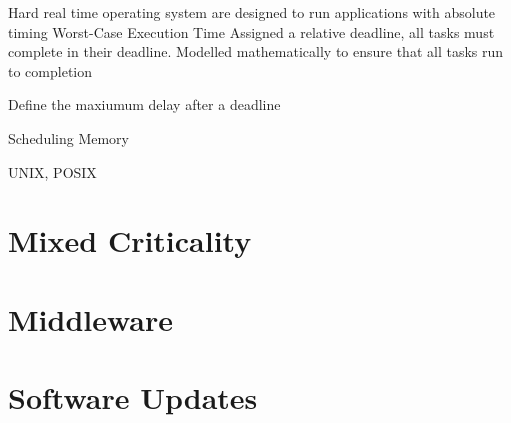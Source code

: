 Hard real time operating system are designed to run applications with absolute timing
Worst-Case Execution Time
Assigned a relative deadline, all tasks must complete in their deadline.
Modelled mathematically to ensure that all tasks run to completion

Define the maxiumum delay after a deadline


Scheduling
Memory

UNIX, POSIX

\section{Mixed Criticality}


\section{Middleware}



\section{Software Updates}
